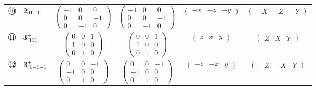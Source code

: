 \documentclass[fleqn,10pt,landscape]{jsarticle}
\begin{document}
\begin{center}
\begin{longtable}{lcccc}
$ {\ooalign{\hfil\resizebox{.8\width}{\height}{10}\hfil\crcr\raise.1ex\hbox{\large$\bigcirc$}}}\quad 2{}_{01-1} $ & $ \begin{pmatrix} -1 & 0 & 0 \\ 0 & 0 & -1 \\ 0 & -1 & 0 \end{pmatrix} $ & $ \begin{pmatrix} -1 & 0 & 0 \\ 0 & 0 & -1 \\ 0 & -1 & 0 \end{pmatrix} $ & $ \begin{pmatrix} - x & - z & - y \end{pmatrix} $ & $ \begin{pmatrix} - X & - Z & - Y \end{pmatrix} $ \\
$ {\ooalign{\hfil\resizebox{.8\width}{\height}{11}\hfil\crcr\raise.1ex\hbox{\large$\bigcirc$}}}\quad 3^{+}_{\,\,111} $ & $ \begin{pmatrix} 0 & 0 & 1 \\ 1 & 0 & 0 \\ 0 & 1 & 0 \end{pmatrix} $ & $ \begin{pmatrix} 0 & 0 & 1 \\ 1 & 0 & 0 \\ 0 & 1 & 0 \end{pmatrix} $ & $ \begin{pmatrix} z & x & y \end{pmatrix} $ & $ \begin{pmatrix} Z & X & Y \end{pmatrix} $ \\
$ {\ooalign{\hfil\resizebox{.8\width}{\height}{12}\hfil\crcr\raise.1ex\hbox{\large$\bigcirc$}}}\quad 3^{+}_{\,\,1-1-1} $ & $ \begin{pmatrix} 0 & 0 & -1 \\ -1 & 0 & 0 \\ 0 & 1 & 0 \end{pmatrix} $ & $ \begin{pmatrix} 0 & 0 & -1 \\ -1 & 0 & 0 \\ 0 & 1 & 0 \end{pmatrix} $ & $ \begin{pmatrix} - z & - x & y \end{pmatrix} $ & $ \begin{pmatrix} - Z & - X & Y \end{pmatrix} $ \\

\end{longtable}
\end{center}
\end{document}
